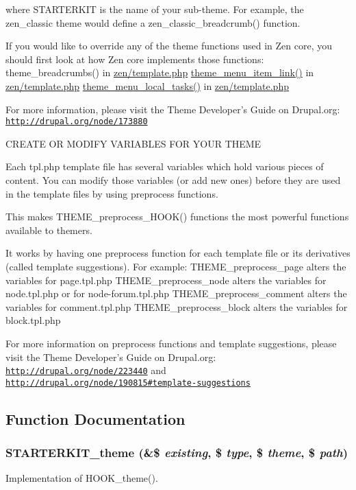 where STARTERKIT is the name of your sub-theme. For example, the zen\_\-classic theme would define a zen\_\-classic\_\-breadcrumb() function.

If you would like to override any of the theme functions used in Zen core, you should first look at how Zen core implements those functions: theme\_\-breadcrumbs() in \hyperlink{sites_2all_2themes_2zen_2template_8php}{zen/template.php} \hyperlink{group__themeable_g77f59240b3aead5df8a777e4f69961b5}{theme\_\-menu\_\-item\_\-link()} in \hyperlink{sites_2all_2themes_2zen_2template_8php}{zen/template.php} \hyperlink{group__themeable_g11a9f127932a0b272cc0c0dabb4e7d0b}{theme\_\-menu\_\-local\_\-tasks()} in \hyperlink{sites_2all_2themes_2zen_2template_8php}{zen/template.php}

For more information, please visit the Theme Developer's Guide on Drupal.org: \href{http://drupal.org/node/173880}{\tt http://drupal.org/node/173880}

CREATE OR MODIFY VARIABLES FOR YOUR THEME

Each tpl.php template file has several variables which hold various pieces of content. You can modify those variables (or add new ones) before they are used in the template files by using preprocess functions.

This makes THEME\_\-preprocess\_\-HOOK() functions the most powerful functions available to themers.

It works by having one preprocess function for each template file or its derivatives (called template suggestions). For example: THEME\_\-preprocess\_\-page alters the variables for page.tpl.php THEME\_\-preprocess\_\-node alters the variables for node.tpl.php or for node-forum.tpl.php THEME\_\-preprocess\_\-comment alters the variables for comment.tpl.php THEME\_\-preprocess\_\-block alters the variables for block.tpl.php

For more information on preprocess functions and template suggestions, please visit the Theme Developer's Guide on Drupal.org: \href{http://drupal.org/node/223440}{\tt http://drupal.org/node/223440} and \href{http://drupal.org/node/190815#template-suggestions}{\tt http://drupal.org/node/190815\#template-suggestions} 

\subsection{Function Documentation}
\hypertarget{sites_2all_2themes_2zen_2STARTERKIT_2template_8php_dd812d94a6ad6fa46e1ce89deac24684}{
\subsubsection[{STARTERKIT\_\-theme}]{\setlength{\rightskip}{0pt plus 5cm}STARTERKIT\_\-theme (\&\$ {\em existing}, \/  \$ {\em type}, \/  \$ {\em theme}, \/  \$ {\em path})}}
\label{sites_2all_2themes_2zen_2STARTERKIT_2template_8php_dd812d94a6ad6fa46e1ce89deac24684}


Implementation of HOOK\_\-theme(). 